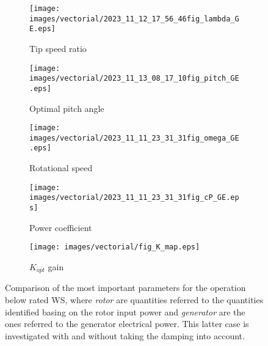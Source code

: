 \begin{figure}[H]
  \begin{subfigure}{0.5\textwidth}
    \centering
    \texttt{[image: images/vectorial/2023\_11\_12\_17\_56\_46fig\_lambda\_GE.eps]}
    \caption{Tip speed ratio}
    \label{fig:2023_06_24_15_57_04fig_lambda_GE}
  \end{subfigure}
  \begin{subfigure}{0.5\textwidth}
    \centering
    \texttt{[image: images/vectorial/2023\_11\_13\_08\_17\_10fig\_pitch\_GE.eps]}
    \caption{Optimal pitch angle}
    \label{fig:2023_06_24_15_57_04fig_pitch_GE}
  \end{subfigure}
  \begin{subfigure}{0.5\textwidth}
    \centering
    \texttt{[image: images/vectorial/2023\_11\_11\_23\_31\_31fig\_omega\_GE.eps]}
    \caption{Rotational speed}
    \label{fig:2023_07_10_14_18_25fig_omega_GE}
  \end{subfigure}
  \begin{subfigure}{0.5\textwidth}
    \centering
    \texttt{[image: images/vectorial/2023\_11\_11\_23\_31\_31fig\_cP\_GE.eps]}
    \caption{Power coefficient}
    \label{fig:2023_06_24_15_57_04fig_cP_GE}
  \end{subfigure}
  \begin{subfigure}{0.5\textwidth}
    \centering
    \texttt{[image: images/vectorial/fig\_K\_map.eps]}
    \caption{$K_{opt}$ gain}
    \label{fig:fig_K_map}
  \end{subfigure}
  \caption{Comparison of the most important parameters for the operation below rated WS, where \textit{rotor} are quantities referred to the quantities identified basing on the rotor input power and \textit{generator} are the ones referred to the generator electrical power. This latter case is investigated with and without taking the damping into account.}
  \label{fig:parameters_for_below_rated}
\end{figure}

